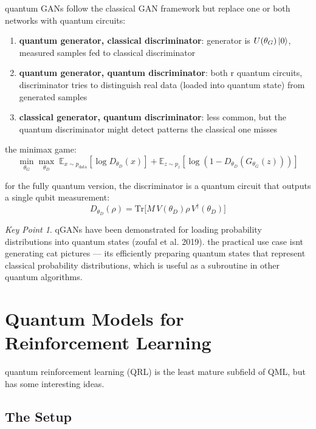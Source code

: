 \documentclass[11pt,a4paper]{article}
\theoremstyle{definition}
\theoremstyle{remark}
\newtheorem*{keypoint}{Key Point}
\begin{document}
quantum GANs follow the classical GAN framework but replace one or both networks with quantum circuits:

\begin{enumerate}[label=\arabic*.]
    \item \textbf{quantum generator, classical discriminator}: generator is $U(\theta_G)\ket{0}$, measured samples fed to classical discriminator
    \item \textbf{quantum generator, quantum discriminator}: both r quantum circuits, discriminator tries to distinguish real data (loaded into quantum state) from generated samples
    \item \textbf{classical generator, quantum discriminator}: less common, but the quantum discriminator might detect patterns the classical one misses
\end{enumerate}

the minimax game:
\begin{equation}
    \min_{\theta_G} \max_{\theta_D} \; \mathbb{E}_{x \sim p_{\text{data}}}[\log D_{\theta_D}(x)] + \mathbb{E}_{z \sim p_z}[\log(1 - D_{\theta_D}(G_{\theta_G}(z)))]
\end{equation}

for the fully quantum version, the discriminator is a quantum circuit that outputs a single qubit measurement:
\begin{equation}
    D_{\theta_D}(\rho) = \text{Tr}\big[M \, V(\theta_D) \rho \, V^\dagger(\theta_D)\big]
\end{equation}

\begin{keypoint}
qGANs have been demonstrated for loading probability distributions into quantum states (zoufal et al. 2019). the practical use case isnt generating cat pictures --- its efficiently preparing quantum states that represent classical probability distributions, which is useful as a subroutine in other quantum algorithms.
\end{keypoint}

\section{Quantum Models for Reinforcement Learning}

quantum reinforcement learning (QRL) is the least mature subfield of QML, but has some interesting ideas.

\subsection{The Setup}
\end{document}
